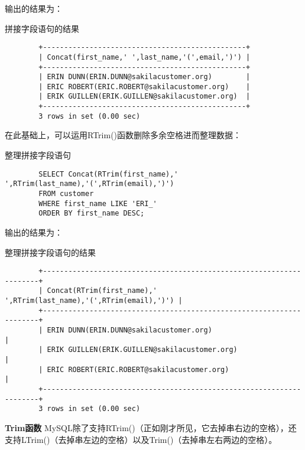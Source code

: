 \documentclass[UTF8]{article}
\begin{document}
输出的结果为：

\begin{listing}[H]
	\caption{拼接字段语句的结果}
	\label{code:concatfieldresult}
\begin{verbatim}
        +------------------------------------------------+
        | Concat(first_name,' ',last_name,'(',email,')') |
        +------------------------------------------------+
        | ERIN DUNN(ERIN.DUNN@sakilacustomer.org)        |
        | ERIC ROBERT(ERIC.ROBERT@sakilacustomer.org)    |
        | ERIK GUILLEN(ERIK.GUILLEN@sakilacustomer.org)  |
        +------------------------------------------------+
        3 rows in set (0.00 sec)
\end{verbatim}
\end{listing}
在此基础上，可以运用RTrim()函数删除多余空格进而整理数据：
\begin{listing}[H]
	\caption{整理拼接字段语句}
	\label{code:treatconcatfield}
\begin{verbatim}
        SELECT Concat(RTrim(first_name),' ',RTrim(last_name),'(',RTrim(email),')')  
        FROM customer 
        WHERE first_name LIKE 'ERI_'
        ORDER BY first_name DESC;
\end{verbatim}
\end{listing}

输出的结果为：

\begin{listing}[H]
	\caption{整理拼接字段语句的结果}
	\label{code:treatconcatfieldresult}
\begin{verbatim}
        +---------------------------------------------------------------------+
        | Concat(RTrim(first_name),' ',RTrim(last_name),'(',RTrim(email),')') |
        +---------------------------------------------------------------------+
        | ERIN DUNN(ERIN.DUNN@sakilacustomer.org)                             |
        | ERIK GUILLEN(ERIK.GUILLEN@sakilacustomer.org)                       |
        | ERIC ROBERT(ERIC.ROBERT@sakilacustomer.org)                         |
        +---------------------------------------------------------------------+
        3 rows in set (0.00 sec)
\end{verbatim}
\end{listing}

\begin{orangebox}[frametitle={Tips 10.2}]
        \textbf{Trim函数} MySQL除了支持RTrim()（正如刚才所见，它去掉串右边的空格），还支持LTrim()（去掉串左边的空格）以及Trim()（去掉串左右两边的空格）。   
\end{orangebox}
\end{document}
